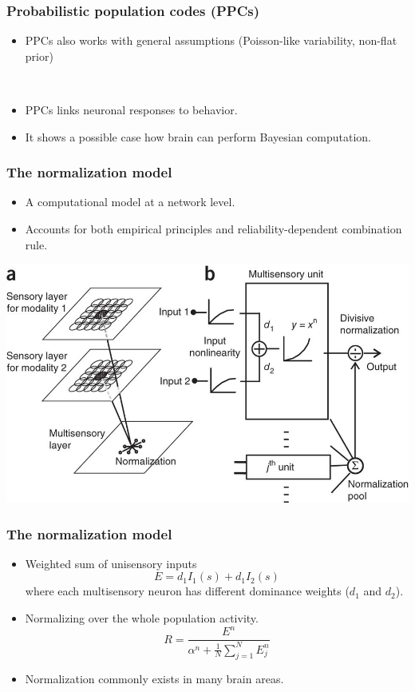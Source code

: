 \documentclass{beamer}
\begin{document}
\begin{frame}
  \frametitle{Probabilistic population codes (PPCs)}
  \begin{itemize}
    \item PPCs also works with general assumptions (Poisson-like variability, non-flat prior)

    ~
    \item PPCs links neuronal responses to behavior.
    \item It shows a possible case how brain can perform Bayesian computation.
  \end{itemize}
\end{frame}

\begin{frame}
  \frametitle{The normalization model}
  \begin{itemize}
    \item A computational model at a network level.
    \item Accounts for both empirical principles and reliability-dependent combination rule.
  \end{itemize}
  \begin{center}
    \includegraphics[width=.8\textwidth]{normalize}
  \end{center}
\end{frame}

\begin{frame}
  \frametitle{The normalization model}
  \begin{itemize}
    \item Weighted sum of unisensory inputs
\begin{equation}
  E = d_1 I_1(s) + d_1 I_2(s)
  \label{eq:step1}
\end{equation}
    where each multisensory neuron has different dominance weights ($d_1$ and $d_2$).
    \item Normalizing over the whole population activity.
\begin{equation}
  R = \frac{E^n}{\alpha^n+\frac{1}{N}\sum_{j=1}^N E_j^n}
  \label{eq:step2}
\end{equation}
    \item Normalization commonly exists in many brain areas.
  \end{itemize}
\end{frame}
\end{document}
